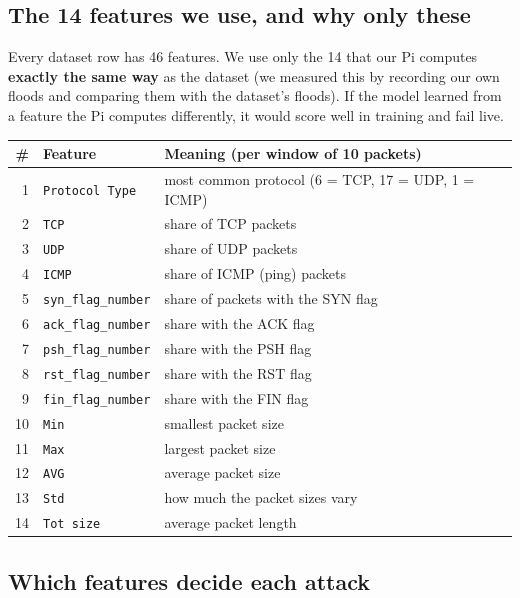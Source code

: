 \documentclass[11pt,a4paper]{article}
\newcommand{\file}[1]{\texttt{\small #1}}
\newcommand{\tablestart}{\Needspace{8\baselineskip}}
\begin{document}
\subsection{The 14 features we use, and why only these}

Every dataset row has 46 features. We use only the 14 that our Pi computes \textbf{exactly the same way} as the
dataset (we measured this by recording our own floods and comparing them with the dataset's floods). If the model
learned from a feature the Pi computes differently, it would score well in training and fail live.

\tablestart
\begin{center}
\begin{tabularx}{\linewidth}{rP{4.2cm}L}
\toprule
\# & Feature & Meaning (per window of 10 packets) \\
 & \file{Protocol Type} & most common protocol (6 = TCP, 17 = UDP, 1 = ICMP) \\
2 & \file{TCP} & share of TCP packets \\
3 & \file{UDP} & share of UDP packets \\
4 & \file{ICMP} & share of ICMP (ping) packets \\
5 & \file{syn\_flag\_number} & share of packets with the SYN flag \\
6 & \file{ack\_flag\_number} & share with the ACK flag \\
7 & \file{psh\_flag\_number} & share with the PSH flag \\
8 & \file{rst\_flag\_number} & share with the RST flag \\
9 & \file{fin\_flag\_number} & share with the FIN flag \\
10 & \file{Min} & smallest packet size \\
11 & \file{Max} & largest packet size \\
12 & \file{AVG} & average packet size \\
13 & \file{Std} & how much the packet sizes vary \\
14 & \file{Tot size} & average packet length \\
\bottomrule
\end{tabularx}
\end{center}

\subsection{Which features decide each attack}\label{sec:attackfeatures}
\end{document}
